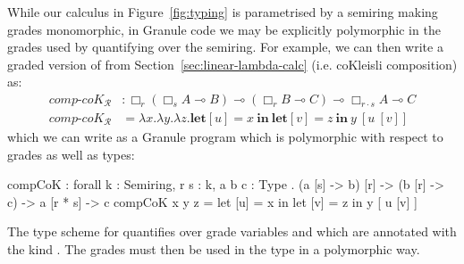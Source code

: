 \begin{example}
\label{example:graded-granule}
While our calculus in Figure~\ref{fig:typing} is parametrised by a semiring
making grades monomorphic, in Granule code we may be explicitly polymorphic in
the grades used by quantifying over the semiring. For example, we can then write
a graded version of  from Section~\ref{sec:linear-lambda-calc}
(i.e. coKleisli composition) as: 
\begin{align*}
\textit{comp-}\textit{coK}_{\mathcal{R}} & : \Box_r (\Box_s A \multimap B) \multimap (\Box_r B \multimap C) \multimap \Box_{r \cdot s} A \multimap C \\
\textit{comp-}\textit{coK}_{\mathcal{R}} & = \lambda x . \lambda y . \lambda z . \textbf{let}[u] = x\ \textbf{in}\ \textbf{let}[v] = z\ \textbf{in}\ y\ [u\ [ v ] ]
\end{align*}
which we can write as a Granule program which is polymorphic with respect to
grades as well as types:
\begin{granule}
compCoK : forall {k : Semiring, r s : k, a b c : Type} 
     . (a [s] -> b) [r] 
     -> (b [r] -> c) 
     -> a [r * s] 
     -> c
compCoK x y z = let [u] = x in let [v] = z in y  [ u [v] ]
\end{granule}
The type scheme for  quantifies over grade variables 
and  which are annotated with the kind . The grades
must then be used in the type in a polymorphic way.



\end{example}

